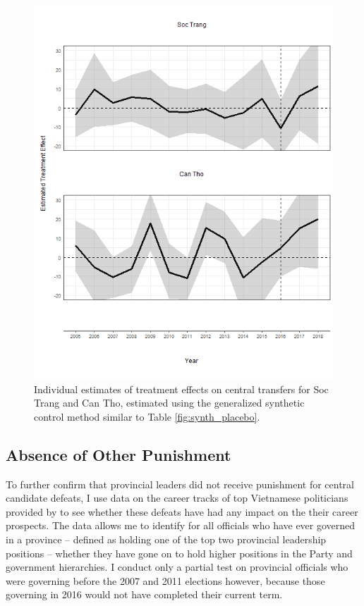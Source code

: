 \documentclass[12pt]{article}
\newcommand{\1}{\mathbbm{1}}
\begin{document}
\begin{figure}[!htbp]
	\centering
	\includegraphics[height=.75\textheight]{figure/190529_synth_results_2prov.png}
	\captionsetup{singlelinecheck=off}
	\caption[Individual synthetic control treatment effects]{Individual estimates of treatment effects on central transfers for Soc Trang and Can Tho, estimated using the generalized synthetic control method similar to Table \ref{fig:synth_placebo}.}
	\label{fig:synth_mech}
\end{figure}

\subsection{Absence of Other Punishment}

To further confirm that provincial leaders did not receive punishment for central candidate defeats, I use data on the career tracks of top Vietnamese politicians provided by \citet{MaleskyPhan2017} to see whether these defeats have had any impact on the their career prospects. The data allows me to identify for all officials who have ever governed in a province -- defined as holding one of the top two provincial leadership positions -- whether they have gone on to hold higher positions in the Party and government hierarchies. I conduct only a partial test on provincial officials who were governing before the 2007 and 2011 elections however, because those governing in 2016 would not have completed their current term.
\end{document}
